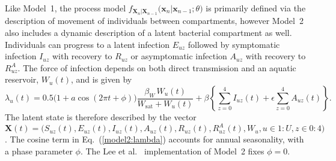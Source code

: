 \documentclass[10pt,letterpaper]{article}\usepackage[]{graphicx}\usepackage[table]{xcolor}
\newcommand\Wsat{W_{\mathrm{sat}}}
\newcommand\transmission{\beta}
\newcommand\seasAmplitude{a}
\newcommand\asymptomRelativeInfect{\epsilon}
\newcommand\phaseParm{\phi}
\newcommand\vaccCounter{z}
\newcommand\paramVec{\theta}
\newcommand\myeqref[1]{(\ref{#1})}
\newcommand\seq[2]{{#1}\!:\!{#2}}
\begin{document}
Like Model~1, the process model $f_{\bm{X}_n|\bm{X}_{n-1}}\big(\bm{x}_{n}|\bm{x}_{n-1}; \paramVec\big)$ is primarily defined via the description of movement of individuals between compartments, however Model~2 also includes a dynamic description of a latent bacterial compartment as well.
Individuals can progress to a latent infection $E_{u\vaccCounter}$ followed by symptomatic infection $I_{u\vaccCounter}$ with recovery to $R_{u\vaccCounter}$ or asymptomatic infection $A_{u\vaccCounter}$ with recovery to $R^A_{u\vaccCounter}$.
The force of infection depends on both direct transmission and an aquatic reservoir, $W_u(t)$, and is given by
\begin{equation}
\label{model2:lambda}
\lambda_{u}(t) = 0.5\big(1+\seasAmplitude \cos(2\pi t + \phaseParm)\big)
\frac{\beta_W\, W_u(t)}{ \Wsat  + W_u(t)} +
\transmission \left\{\sum_{\vaccCounter=0}^4 I_{u\vaccCounter}(t) + \asymptomRelativeInfect \sum_{\vaccCounter=0}^4 A_{u\vaccCounter}(t) \right\}.
\end{equation}
The latent state is therefore described by the vector $\bm{X}(t) = \big(S_{u\vaccCounter}(t),\allowbreak E_{u\vaccCounter}(t),\allowbreak I_{u\vaccCounter}(t),\allowbreak A_{u\vaccCounter}(t),\allowbreak R_{u\vaccCounter}(t),\allowbreak R_{u\vaccCounter}^A(t),\allowbreak W_u,\allowbreak u \in \seq{1}{U},\allowbreak \vaccCounter \in \seq{0}{4}\big)$.
The cosine term in Eq.~\myeqref{model2:lambda} accounts for annual seasonality, with a phase parameter $\phaseParm$.
The Lee et al.~\cite{lee20} implementation of Model~2 fixes $\phaseParm = 0$.
\end{document}
